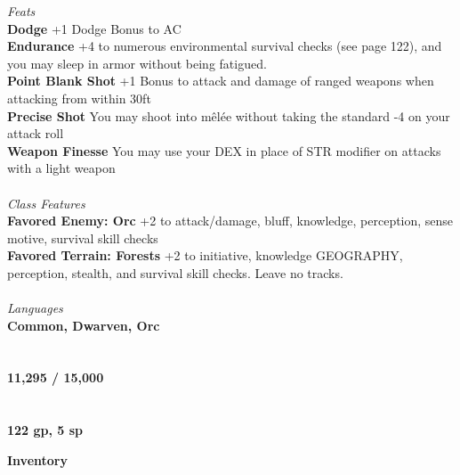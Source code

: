 \documentclass[letterpaper]{article}
\begin{document}
\noindent\emph{Feats} \\
\noindent\textbf{Dodge} +1 Dodge Bonus to AC \\
\noindent\textbf{Endurance} +4 to numerous environmental survival checks (see page 122), and you may sleep in armor without being fatigued.\\
\noindent\textbf{Point Blank Shot} +1 Bonus to attack and damage of ranged weapons when attacking from within 30ft \\
\noindent\textbf{Precise Shot} You may shoot into m\^{e}l\'{e}e without taking the standard -4 on your attack roll \\
\noindent\textbf{Weapon Finesse} You may use your DEX in place of STR modifier on attacks with a light weapon \\
\\
\noindent\emph{Class Features} \\
\textbf{Favored Enemy: Orc} +2 to attack/damage, bluff, knowledge, perception, sense motive, survival skill checks \\
\textbf{Favored Terrain: Forests} +2 to initiative, knowledge {\scriptsize GEOGRAPHY}, perception, stealth, and survival skill checks.  Leave no tracks. \\
\\
\noindent\emph{Languages} \\
\textbf{Common, Dwarven, Orc} \\
\\
 \\
\textbf{11,295 / 15,000} \\
\\
 \\
\textbf{122 gp, 5 sp} \\

\pagebreak

\noindent \textbf{\huge{Inventory}} \\
\end{document}
